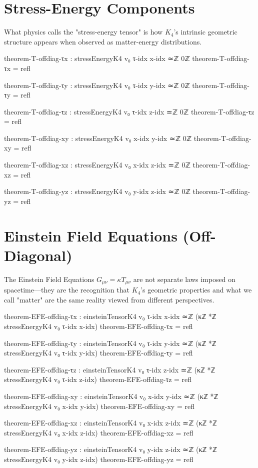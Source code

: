 \documentclass[11pt,a4paper]{book}
\begin{document}
\section{Stress-Energy Components}

What physics calls the "stress-energy tensor" is how $K_4$'s intrinsic geometric structure appears when observed as matter-energy distributions.

\begin{code}
theorem-T-offdiag-τx : stressEnergyK4 v₀ τ-idx x-idx ≃ℤ 0ℤ
theorem-T-offdiag-τx = refl

theorem-T-offdiag-τy : stressEnergyK4 v₀ τ-idx y-idx ≃ℤ 0ℤ
theorem-T-offdiag-τy = refl

theorem-T-offdiag-τz : stressEnergyK4 v₀ τ-idx z-idx ≃ℤ 0ℤ
theorem-T-offdiag-τz = refl

theorem-T-offdiag-xy : stressEnergyK4 v₀ x-idx y-idx ≃ℤ 0ℤ
theorem-T-offdiag-xy = refl

theorem-T-offdiag-xz : stressEnergyK4 v₀ x-idx z-idx ≃ℤ 0ℤ
theorem-T-offdiag-xz = refl

theorem-T-offdiag-yz : stressEnergyK4 v₀ y-idx z-idx ≃ℤ 0ℤ
theorem-T-offdiag-yz = refl
\end{code}

\section{Einstein Field Equations (Off-Diagonal)}

The Einstein Field Equations $G_{\mu\nu} = \kappa T_{\mu\nu}$ are not separate laws imposed on spacetime—they are the recognition that $K_4$'s geometric properties and what we call "matter" are the same reality viewed from different perspectives.

\begin{code}
theorem-EFE-offdiag-τx : einsteinTensorK4 v₀ τ-idx x-idx ≃ℤ (κℤ *ℤ stressEnergyK4 v₀ τ-idx x-idx)
theorem-EFE-offdiag-τx = refl

theorem-EFE-offdiag-τy : einsteinTensorK4 v₀ τ-idx y-idx ≃ℤ (κℤ *ℤ stressEnergyK4 v₀ τ-idx y-idx)
theorem-EFE-offdiag-τy = refl

theorem-EFE-offdiag-τz : einsteinTensorK4 v₀ τ-idx z-idx ≃ℤ (κℤ *ℤ stressEnergyK4 v₀ τ-idx z-idx)
theorem-EFE-offdiag-τz = refl

theorem-EFE-offdiag-xy : einsteinTensorK4 v₀ x-idx y-idx ≃ℤ (κℤ *ℤ stressEnergyK4 v₀ x-idx y-idx)
theorem-EFE-offdiag-xy = refl

theorem-EFE-offdiag-xz : einsteinTensorK4 v₀ x-idx z-idx ≃ℤ (κℤ *ℤ stressEnergyK4 v₀ x-idx z-idx)
theorem-EFE-offdiag-xz = refl

theorem-EFE-offdiag-yz : einsteinTensorK4 v₀ y-idx z-idx ≃ℤ (κℤ *ℤ stressEnergyK4 v₀ y-idx z-idx)
theorem-EFE-offdiag-yz = refl
\end{code}
\end{document}

